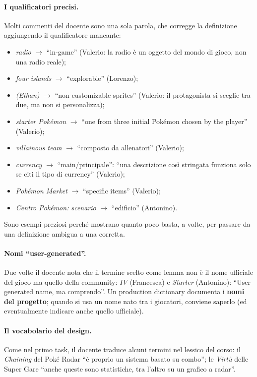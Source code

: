 \paragraph{I qualificatori precisi.} Molti commenti del docente sono una sola
parola, che corregge la definizione aggiungendo il qualificatore mancante:
\begin{itemize}
  \item \emph{radio} $\rightarrow$ ``in-game'' (Valerio: la radio è un oggetto
        del mondo di gioco, non una radio reale);
  \item \emph{four islands} $\rightarrow$ ``explorable'' (Lorenzo);
  \item \emph{(Ethan)} $\rightarrow$ ``non-customizable sprites'' (Valerio:
        il protagonista si sceglie tra due, ma non si personalizza);
  \item \emph{starter Pokémon} $\rightarrow$ ``one from three initial
        Pokémon chosen by the player'' (Valerio);
  \item \emph{villainous team} $\rightarrow$ ``composto da allenatori''
        (Valerio);
  \item \emph{currency} $\rightarrow$ ``main/principale'': ``una descrizione
        così stringata funziona solo se citi il tipo di currency'' (Valerio);
  \item \emph{Pokémon Market} $\rightarrow$ ``specific items'' (Valerio);
  \item \emph{Centro Pokémon: scenario} $\rightarrow$ ``edificio'' (Antonino).
\end{itemize}
Sono esempi preziosi perché mostrano quanto poco basta, a volte, per passare
da una definizione ambigua a una corretta.

\paragraph{Nomi ``user-generated''.} Due volte il docente nota che il termine
scelto come lemma non è il nome ufficiale del gioco ma quello della community:
\emph{IV} (Francesca) e \emph{Starter} (Antonino): ``User-generated name, ma
comprendo''. Un production dictionary documenta i \textbf{nomi del
progetto}; quando si usa un nome nato tra i giocatori, conviene saperlo (ed
eventualmente indicare anche quello ufficiale).

\paragraph{Il vocabolario del design.} Come nel primo task, il docente
traduce alcuni termini nel lessico del corso: il \emph{Chaining} del Poké
Radar ``è proprio un sistema basato su combo''; le \emph{Virtù} delle Super
Gare ``anche queste sono statistiche, tra l'altro su un grafico a radar''.

